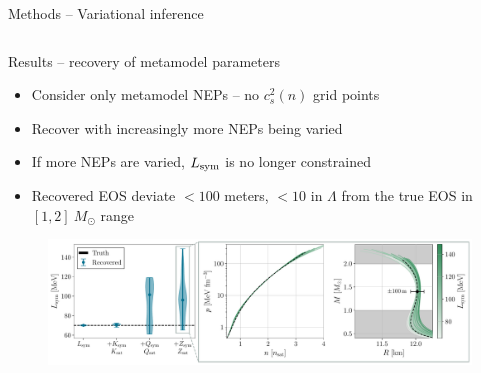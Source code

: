 \documentclass[usenames,dvipsnames,t]{beamer}
\begin{document}
\begin{frame}{Methods -- Variational inference}
\begin{columns}
  \end{columns}
\end{frame}

\begin{frame}{Results -- recovery of metamodel parameters}

  \def\x{3mm}

  \begin{itemize}
    \item Consider only metamodel NEPs -- no $c_s^2(n)$ grid points

    \vspace{\x}

    \item Recover with increasingly more NEPs being varied

    \vspace{\x}

    \item If more NEPs are varied, $L_{\rm{sym}}$ is no longer constrained

    \vspace{\x}
    
    \item Recovered EOS deviate $<100$ meters, $<10$ in $\Lambda$ from the true EOS in $[1, 2] \ M_\odot$ range
  \end{itemize}

  \begin{figure}
    \centering
    \includegraphics[width=1.0\linewidth]{Figures/money_plot.pdf}
  \end{figure}
\end{frame}
\end{document}
